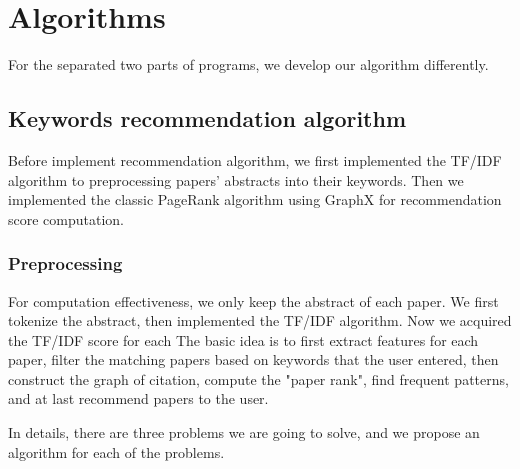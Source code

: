 \section{Algorithms}

For the separated two parts of programs, we develop our algorithm differently. 

\subsection{Keywords recommendation algorithm}

Before implement recommendation algorithm, we first implemented the TF/IDF algorithm to preprocessing papers' abstracts into their keywords. Then we implemented the classic PageRank algorithm using GraphX for recommendation score computation.

\subsubsection{Preprocessing}

For computation effectiveness, we only keep the abstract of each paper. We first tokenize the abstract, then implemented the TF/IDF algorithm. Now we acquired the TF/IDF score for each 
The basic idea is to first extract features for each paper, filter the matching papers based on keywords that the user entered, then construct the graph of citation, compute the "paper rank", find frequent patterns, and at last recommend papers to the user.

In details, there are three problems we are going to solve, and we propose an algorithm for each of the problems.

